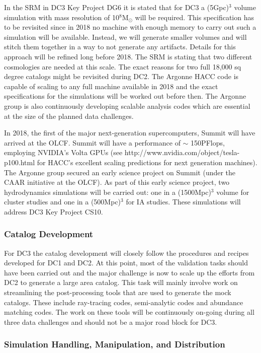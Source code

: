 In the SRM in DC3 Key Project DG6 it is stated that for DC3 a (5Gpc)$^3$ volume simulation with mass resolution of 10$^8$M$_\odot$ will be required. This specification has to be revisited since in 2018 no machine with enough memory to carry out such a simulation will be available. Instead, we will generate smaller volumes and will stitch them together in a way to not generate any artifacts. Details for this approach will be refined long before 2018. The SRM is stating that two different cosmologies are needed at this scale. The exact reasons for two full 18,000 sq degree catalogs might be revisited during DC2. The Argonne HACC code is capable of scaling to any full machine available in 2018 and the exact specifications for the simulations will be worked out before then. The Argonne group is also continuously developing scalable analysis codes which are essential at the size of the planned data challenges.

In 2018, the first of the major next-generation supercomputers, Summit will have arrived at the OLCF. Summit will have a performance of $\sim$ 150PFlops, employing NVIDIA's Volta GPUs (see http://www.nvidia.com/object/tesla-p100.html for HACC's excellent scaling predictions for next generation machines). The Argonne group secured an early science project on Summit (under the CAAR initiative at the OLCF). As part of this early science project, two hydrodynamics simulations will be carried out: one in a (1500Mpc)$^3$ volume for cluster studies and one in a (500Mpc)$^3$ for IA studies. These simulations will address DC3 Key Project CS10.

\subsubsection{Catalog Development}
\label{sec:keysims:dc3:dev}

For DC3 the catalog development will closely follow the procedures and recipes developed for DC1 and DC2. At this point, most of the validation tasks should have been carried out and the major challenge is now to scale up the efforts from DC2 to generate a large area catalog. This task will mainly involve work on streamlining the post-processing tools that are used to generate the mock catalogs. These include ray-tracing codes, semi-analytic codes and abundance matching codes. The work on these tools will be continuously on-going during all three data challenges and should not be a major road block for DC3.

\subsubsection{Simulation Handling, Manipulation, and Distribution}
\label{sec:keysims:dc3:handling}

